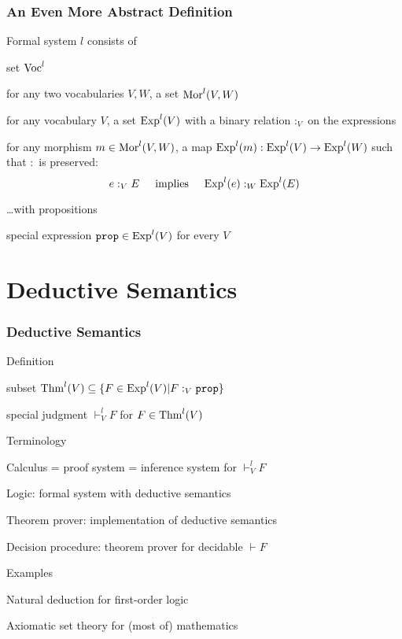 \begin{frame}\frametitle{An Even More Abstract Definition}

\begin{blockitems}{Formal system $l$ consists of}
\item set $\mathrm{Voc}^l$ 
\item for any two vocabularies $V,W$, a set $\mathrm{Mor}^l(V,W)$ 
\item for any vocabulary $V$, a set $\mathrm{Exp}^l(V)$ 
  with a binary relation $:_V$ on the expressions
\item for any morphism $m\in\mathrm{Mor}^l(V,W)$, a map $\mathrm{Exp}^l(m):\mathrm{Exp}^l(V)\to\mathrm{Exp}^l(W)$ 
  such that $:$ is preserved:
   \[e:_V E \hspace*{.5cm}\text{implies}\hspace*{.5cm} \mathrm{Exp}^l(e):_W \mathrm{Exp}^l(E)\]
\end{blockitems}

\begin{blockitems}{\ldots with propositions}
\item special expression $\prop\in\Exp^l(V)$ for every $V$
\end{blockitems}
\end{frame}

\section{Deductive Semantics}

\begin{frame}\frametitle{Deductive Semantics}
\begin{blockitems}{Definition}
\item subset $\Thm^l(V)\sq \{F\in\Exp^l(V) | F:_V\prop\}$ 
\item special judgment $\vdash^l_V F$ for $F\in\mathrm{Thm}^l(V)$
\end{blockitems}

\begin{blockitems}{Terminology}
\item Calculus = proof system = inference system for $\vdash^l_V F$
\item Logic: formal system with deductive semantics
\item Theorem prover: implementation of deductive semantics
\item Decision procedure: theorem prover for decidable $\vdash F$
\end{blockitems}

\begin{blockitems}{Examples}
\item Natural deduction for first-order logic
\item Axiomatic set theory for (most of) mathematics
\end{blockitems}
\end{frame}

